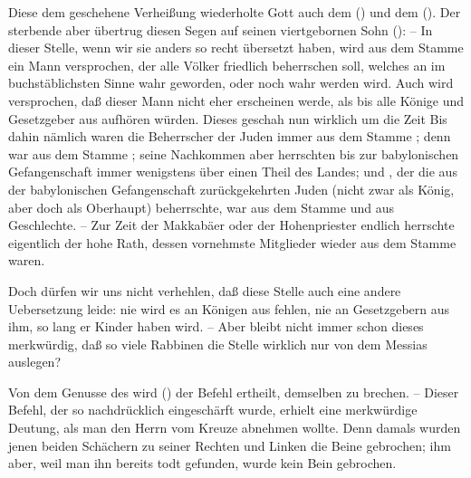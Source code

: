 \begin{aufza}
\item Diese dem  geschehene Verheißung wiederholte Gott auch dem  () und dem  (). Der sterbende  aber übertrug diesen Segen auf seinen viertgebornen Sohn  ():  -- In dieser Stelle, wenn wir sie anders so recht übersetzt haben, wird aus dem Stamme  ein Mann versprochen, der alle Völker friedlich beherrschen soll, welches an  im buchstäblichsten Sinne wahr geworden, oder noch wahr werden wird. Auch wird versprochen, daß dieser Mann nicht eher erscheinen werde, als bis alle Könige und Gesetzgeber aus  aufhören würden. Dieses geschah nun wirklich um die Zeit  Bis dahin nämlich waren die Beherrscher der Juden immer aus dem Stamme ; denn  war aus dem Stamme ; seine Nachkommen aber herrschten bis zur babylonischen Gefangenschaft immer wenigstens über einen Theil des Landes; und , der die aus der babylonischen Gefangenschaft zurückgekehrten Juden (nicht zwar als König, aber doch als Oberhaupt) beherrschte, war aus dem Stamme  und aus  Geschlechte. -- Zur Zeit der Makkabäer oder der Hohenpriester endlich herrschte eigentlich der hohe Rath, dessen vornehmste Mitglieder wieder aus dem Stamme  waren.

\begin{RWanm} 
Doch dürfen wir uns nicht verhehlen, daß diese Stelle auch eine andere Uebersetzung leide: nie wird es an Königen aus  fehlen, nie an Gesetzgebern aus ihm, so lang er Kinder haben wird. -- Aber bleibt nicht immer schon dieses merkwürdig, daß so viele Rabbinen die Stelle wirklich nur von dem Messias auslegen?
\end{RWanm}


\item Von dem Genusse des  wird () der Befehl ertheilt, demselben  zu brechen. -- Dieser Befehl, der so nachdrücklich eingeschärft wurde, erhielt eine merkwürdige Deutung, als man den Herrn vom Kreuze abnehmen wollte. Denn damals wurden jenen beiden Schächern zu seiner Rechten und Linken die Beine gebrochen; ihm aber, weil man ihn bereits todt gefunden, wurde kein Bein gebrochen.
\end{aufza}

